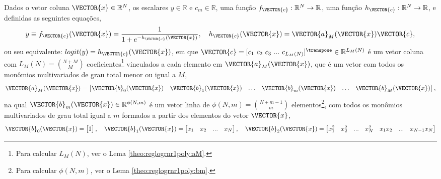 
\begin{myproofT}\label{proof:theo:reglogrnr1poly}
Dados
o vetor coluna $\VECTOR{x} \in \mathbb{R}^{N}$, os escalares $y \in \mathbb{R}$ e $c_m \in \mathbb{R}$,
uma função $f_{\VECTOR{c}}:\mathbb{R}^{N} \rightarrow \mathbb{R}$, 
uma função $h_{\VECTOR{c}}:\mathbb{R}^{N} \rightarrow \mathbb{R}$,  e 
definidas as seguintes equações,
\begin{equation}\label{eq:proof:theo:reglogrnr1poly:1}
y\equiv f_{\VECTOR{c}}(\VECTOR{x})= \frac{1}{1+e^{-h_{\VECTOR{c}}(\VECTOR{x}) }},
\quad h_{\VECTOR{c}}(\VECTOR{x}) =  \VECTOR{a}_M(\VECTOR{x})\VECTOR{c},
\end{equation}
ou seu equivalente: $logit(y)=h_{\VECTOR{c}}(\VECTOR{x})$,
em que $\VECTOR{c}=[c_1~ c_2~ c_3~  ...~ c_{L_M(N)}]^{\transpose} \in \mathbb{R}^{L_M(N)}$ é um vetor coluna
com $L_M(N)=\binom{N+M}{M}$ coeficientes\footnote{Para calcular $L_M(N)$, ver o Lema \ref{theo:reglogrnr1poly:aM}.} 
vinculados a cada elemento em
$\VECTOR{a}_M(\VECTOR{x})$, que  é um vetor com todos os monômios multivariados de grau total menor ou igual a $M$,
\begin{equation}\label{eq:proof:theo:reglogrnr1poly:2}
\VECTOR{a}_M(\VECTOR{x})=
\begin{bmatrix}
\VECTOR{b}_0(\VECTOR{x}) &
\VECTOR{b}_1(\VECTOR{x}) &
\hdots &
\VECTOR{b}_m(\VECTOR{x}) &
\hdots &
\VECTOR{b}_M(\VECTOR{x}) 
\end{bmatrix},
\end{equation}
na qual $\VECTOR{b}_m(\VECTOR{x}) \in \mathbb{R}^{\phi(N,m)}$ é um vetor linha 
de $\phi(N,m)=\binom{N+m-1}{m}$ elementos\footnote{Para calcular $\phi(N,m)$, ver o Lema \ref{theo:reglogrnr1poly:bm}.},
com todos os monômios multivariados de grau total igual a $m$
formados a partir dos elementos do vetor $\VECTOR{x}$,
\begin{equation}\label{eq:proof:theo:reglogrnr1poly:3}
\VECTOR{b}_0(\VECTOR{x})=
\begin{bmatrix}
1 
\end{bmatrix},
\quad 
\VECTOR{b}_1(\VECTOR{x})=
\begin{bmatrix}
x_1 & x_2 & ... &  x_N
\end{bmatrix},
\quad 
\VECTOR{b}_2(\VECTOR{x})=
\begin{bmatrix}
x_1^2 & x_2^2 & ... &  x_N^2 & x_1 x_2 &  ... & x_{N-1} x_N

\end{bmatrix}
\end{equation}
\end{myproofT}

